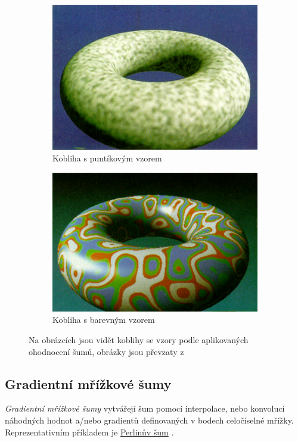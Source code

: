 \begin{figure}[H]
	\centering
	\begin{subfigure}{0.5\textwidth}
		\centering
		\includegraphics[scale=0.475]{obrazky-figures/SpottedDoughnut.png}
		\caption{Kobliha s puntíkovým vzorem}
		\label{SpottedDoughnut}
	\end{subfigure}
	\begin{subfigure}{0.4\textwidth}
		\centering
		\includegraphics[scale=0.5]{obrazky-figures/ColoredDoughnut.png}
		\caption{Kobliha s barevným vzorem}
		\label{ColoredDoughnut}
	\end{subfigure}
	\caption{Na obrázcích jsou vidět koblihy se vzory podle aplikovaných ohodnocení šumů, obrázky jsou převzaty z \cite{PerlinKen}}
	\label{Doughnuts}
\end{figure}

\subsection{Gradientní mřížkové šumy}
\label{LatticeNoises}
\textit{Gradientní mřížkové šumy} vytvářejí šum pomocí interpolace, nebo konvolucí náhodných hodnot a/nebo gradientů definovaných v bodech celočíselné mřížky. Reprezentativním příkladem je \hyperref[perlinNoise]{Perlinův šum} \cite{Lagae10}.

